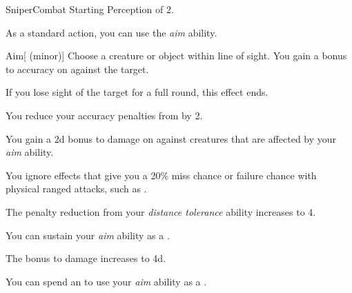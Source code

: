     \begin{feat}{Sniper}{Combat}
        \featpre Starting Perception of 2.

         As a standard action, you can use the \textit{aim} ability.
        \begin{ability}{Aim}[ (minor)]
            Choose a creature or object within line of sight.
            You gain a  bonus to accuracy on  against the target.

            If you lose sight of the target for a full round, this effect ends.
        \end{ability}

         You reduce your accuracy penalties from  by 2.

         You gain a \plus2d bonus to damage on  against \unaware creatures that are affected by your \textit{aim} ability.

         You ignore effects that give you a 20\% miss chance or failure chance with physical ranged attacks, such as .

         The penalty reduction from your \textit{distance tolerance} ability increases to 4.

         You can sustain your \textit{aim} ability as a .

         The bonus to damage increases to \plus4d.

         You can spend an  to use your \textit{aim} ability as a .
    \end{feat}

